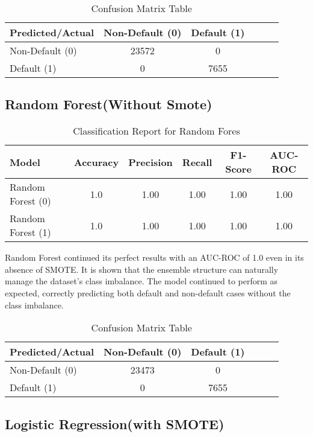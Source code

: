 \documentclass[12pt, a4paper,oneside]{book}
\numberwithin{equation}{section}
\begin{document}
\begin{table}[h!]
\centering
\begin{tabular}{|l|c|c|c|c|c|}
\hline
\textbf{Predicted/Actual} & \textbf{Non-Default (0)} & \textbf{	Default (1)} \\ \hline
Non-Default (0) & 23572 & 0 \\ \hline
Default (1) & 0 & 7655  \\ \hline
\end{tabular}
\caption{Confusion Matrix Table}
\end{table}


\subsection{Random Forest(Without Smote)}
\begin{table}[h!]
\centering
\begin{tabular}{|l|c|c|c|c|c|}
\hline
\textbf{Model} & \textbf{Accuracy} & \textbf{Precision} & \textbf{Recall} & \textbf{F1-Score} & \textbf{AUC-ROC} \\ \hline
Random Forest (0) & 1.0 & 1.00 & 1.00 & 1.00 & 1.00 \\ 
Random Forest (1) & 1.0 & 1.00 & 1.00 & 1.00 & 1.00 \\
\hline
\end{tabular}
\label{tab:performance_metrics}
\caption{Classification Report for Random Fores}
\end{table}

Random Forest continued its perfect results with an AUC-ROC of 1.0 even in its absence of SMOTE. It is shown that the ensemble structure can naturally manage the dataset's class imbalance. The model continued to perform as expected, correctly predicting both default and non-default cases without the class imbalance.

\begin{table}[h!]
\centering
\begin{tabular}{|l|c|c|c|c|c|}
\hline
\textbf{Predicted/Actual} & \textbf{Non-Default (0)} & \textbf{	Default (1)} \\ \hline
Non-Default (0) & 23473 & 0 \\ \hline
Default (1) & 0 & 7655  \\ \hline
\end{tabular}
\caption{Confusion Matrix Table}
\end{table}

\newpage
\subsection{ Logistic Regression(with SMOTE) }
\end{document}
